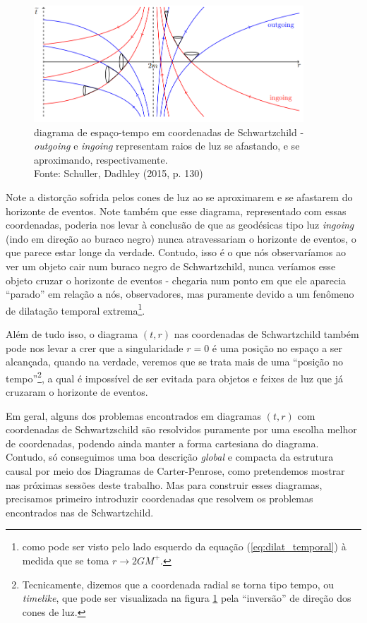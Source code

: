 \documentclass[12pt, a4paper]{article}
\theoremstyle{meuremarkstyle}
\theoremstyle{definicao}
\begin{document}
\begin{figure}[h!]
  \centering
  \includegraphics[width=0.9\textwidth]{Figuras/diag_schwc.png}
  \caption{diagrama de espaço-tempo em coordenadas de Schwartzchild - \textit{outgoing} e
          \textit{ingoing} representam raios de luz se afastando, e se aproximando, respectivamente. \\Fonte: Schuller, Dadhley (2015, p. 130)\cite{schuller2015}}
  \label{fig:diag_schwc}
\end{figure}

Note a distorção sofrida pelos cones de luz ao se aproximarem e se afastarem do horizonte de eventos. Note também que
esse diagrama, representado com essas coordenadas, poderia nos levar à conclusão de que as geodésicas tipo luz \textit{ingoing} (indo em direção ao buraco negro)
nunca atravessariam o horizonte de eventos, o que parece estar longe da verdade. Contudo, isso é o que nós observaríamos ao ver um objeto cair num
buraco negro de Schwartzchild, nunca veríamos esse objeto cruzar o horizonte de eventos - chegaria num ponto em que
ele aparecia \enquote{parado} em relação a nós, observadores, mas puramente devido a um fenômeno de dilatação
temporal extrema\footnote{como pode ser visto pelo lado esquerdo da equação (\ref{eq:dilat_temporal}) à medida que se toma $r \to 2GM^{+}$.}.  

Além de tudo isso, o diagrama $(t,r)$ nas coordenadas de Schwartzchild também pode nos levar a crer que a singularidade
$r=0$ é uma posição no espaço a ser alcançada, quando na verdade, veremos que se trata mais de uma \enquote{posição no tempo}\footnote{Tecnicamente, dizemos que a coordenada radial se torna tipo tempo, ou \textit{timelike}, que pode ser visualizada na figura \ref{fig:diag_schwc} pela \enquote{inversão} de direção dos cones de luz.},
a qual é impossível de ser evitada para objetos e feixes de luz que já cruzaram o horizonte de eventos.

Em geral, alguns dos problemas encontrados em diagramas $(t,r)$ com coordenadas de Schwartzschild são resolvidos puramente por uma
escolha melhor de coordenadas, podendo ainda manter a forma cartesiana do diagrama. Contudo, só conseguimos uma boa descrição \textit{global} e compacta da estrutura causal por meio dos Diagramas de Carter-Penrose, como pretendemos mostrar nas próximas sessões deste trabalho. Mas para construir esses diagramas, precisamos primeiro introduzir coordenadas que resolvem os problemas encontrados nas de Schwartzchild.
\end{document}
